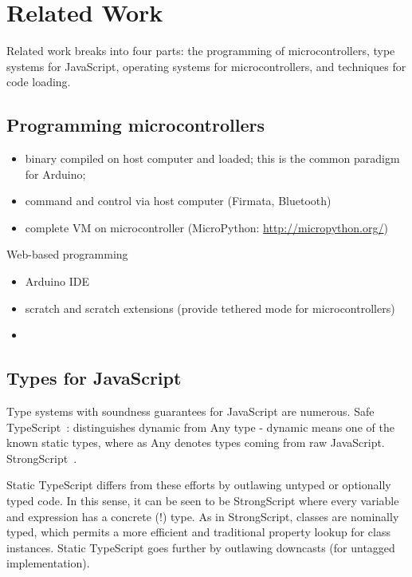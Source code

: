 \section{Related Work}
\label{sec:related}

Related work breaks into four parts: the programming of microcontrollers, 
type systems for JavaScript, operating systems
for microcontrollers, and techniques for code loading.

\subsection{Programming microcontrollers}

\begin{itemize}
\item binary compiled on host computer and loaded; this is the common paradigm for Arduino;
\item command and control via host computer (Firmata, Bluetooth)
\item complete VM on microcontroller (MicroPython: \url{http://micropython.org/})
\end{itemize}

Web-based programming

\begin{itemize}
\item Arduino IDE
\item scratch and scratch extensions (provide tethered mode for microcontrollers)
\item 
\end{itemize}

\subsection{Types for JavaScript}

Type systems with soundness guarantees for JavaScript are numerous. 
Safe TypeScript~\cite{SafeTypeScript15}: distinguishes dynamic from Any type - dynamic means
one of the known static types, where as Any denotes types coming
from raw JavaScript.
StrongScript~\cite{StrongScriptECOOP15}.

Static TypeScript differs from these efforts by outlawing untyped or optionally typed
code.  In this sense, it can be seen to be StrongScript where every variable and 
expression has a concrete (!) type.   As in StrongScript, classes are nominally typed,
which permits a more efficient and traditional property lookup for class instances. 
Static TypeScript goes further by outlawing downcasts (for untagged implementation).


